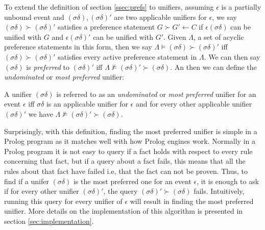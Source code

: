To extend the definition of section \ref{ssec:prefs} to unifiers, assuming $\epsilon$ is a partially unbound event and $(\sigma\delta),(\sigma\delta)'$ are two applicable unifiers for $\epsilon$, we say $(\sigma\delta) \succ (\sigma\delta)'$ satisfies a preference statement $G \succ G' \leftarrow C$ if $\epsilon(\sigma\delta)$ can be unified with $G$ and $\epsilon(\sigma\delta)'$ can be unified with $G'$. Given  $\Lambda$, a set of acyclic preference statements in this form, then we say $\Lambda \models (\sigma\delta) \succ (\sigma\delta)'$ iff $(\sigma\delta) \succ (\sigma\delta)'$ satisfies every active preference statement in $\Lambda$. We can then say $(\sigma\delta)$ is \textit{preferred} to $(\sigma\delta)'$ iff $\Lambda \not\models (\sigma\delta)' \succ (\sigma\delta)$. An then we can define the \textit{undominated} or \textit{most preferred} unifier:

\begin{ddefinition}
\label{def:mpu}
A unifier $(\sigma\delta)$ is referred to as an \textit{undominated} or \textit{most preferred} unifier for an event $\epsilon$ iff $\sigma\delta$ is an applicable unifier for $\epsilon$ and for every other applicable unifier $(\sigma\delta)'$ we have $\Lambda \not\models (\sigma\delta)' \succ (\sigma\delta)$.
\end{ddefinition}

Surprisingly, with this definition, finding the most preferred unifier is simple in a Prolog program as it matches well with how Prolog engines work. Normally in a Prolog program it is not easy to query if a fact holds with respect to every rule concerning that fact, but if a query about a fact fails, this means that all the rules about that fact have failed i.e, that the fact can not be proven. Thus, to find if a unifer $(\sigma\delta)$ is the most preferred one for an event $\epsilon$, it is enough to ask if for every other unifier $(\sigma\delta)'$, the query $(\sigma\delta)' \succ (\sigma\delta)$ fails. Intuitively, running this query for every unifier of $\epsilon$ will result in finding the most preferred unifier. More details on the implementation of this algorithm is presented in section \ref{sec:implementation}.


